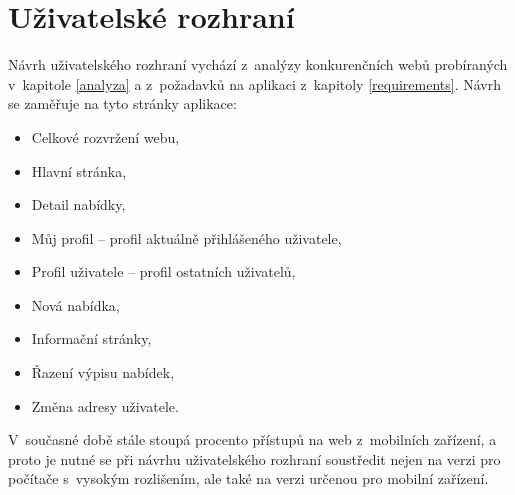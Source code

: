 \chapter{Uživatelské rozhraní}
\label{nur}

Návrh uživatelského rozhraní vychází z~analýzy konkurenčních webů probíraných v~kapitole \ref{analyza} a z~požadavků na aplikaci z~kapitoly \ref{requirements}. Návrh se zaměřuje na tyto stránky aplikace:
\begin{itemize}
    \item Celkové rozvržení webu,
	\item Hlavní stránka,
	\item Detail nabídky,
	\item Můj profil -- profil aktuálně přihlášeného uživatele,
	\item Profil uživatele -- profil ostatních uživatelů,
	\item Nová nabídka,
	\item Informační stránky,
	\item Řazení výpisu nabídek,
	\item Změna adresy uživatele.
\end{itemize}
V~současné době stále stoupá procento přístupů na web z~mobilních zařízení, a proto je nutné se při návrhu uživatelského rozhraní soustředit nejen na verzi pro počítače s~vysokým rozlišením, ale také na verzi určenou pro mobilní zařízení.








%



